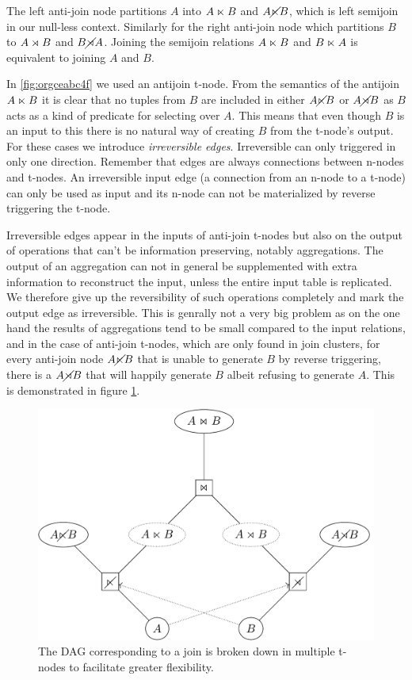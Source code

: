The left anti-join node partitions \(A\) into \(A \ltimes B\) and
\(A \cancel\ltimes B\), which is left semijoin in our null-less
context. Similarly for the right anti-join node which partitions \(B\) to \(A \rtimes B\) and \(B \cancel\rtimes A\). Joining the semijoin
relations \(A \ltimes B\) and \(B \ltimes A\) is equivalent to
joining \(A\) and \(B\).

In \ref{fig:orgceabc4f} we used an antijoin t-node. From the semantics of the
antijoin \(A \ltimes B\) it is clear that no tuples from \(B\) are
included in either \(A \cancel\ltimes B\) or \(A \cancel\rtimes B\) as \(B\) acts
as a kind of predicate for selecting over \(A\). This means that even
though \(B\) is an input to this there is no natural way of creating \(B\)
from the t-node's output. For these cases we introduce \emph{irreversible
  edges}. Irreversible can only triggered in only one
direction. Remember that edges are always connections between n-nodes
and t-nodes. An irreversible input edge (a connection from an n-node
to a t-node) can only be used as input and its n-node can not be
materialized by reverse triggering the t-node.

Irreversible edges appear in the inputs of anti-join t-nodes but also
on the output of operations that can't be information preserving,
notably aggregations. The output of an aggregation can not in general
be supplemented with extra information to reconstruct the input,
unless the entire input table is replicated. We therefore give up the
reversibility of such operations completely and mark the output edge
as irreversible. This is genrally not a very big problem as on the one
hand the results of aggregations tend to be small compared to the
input relations, and in the case of anti-join t-nodes, which are only
found in join clusters, for every anti-join node \(A \cancel\ltimes B\) that
is unable to generate \(B\) by reverse triggering, there is a \(A
\cancel\rtimes B\) that will happily generate \(B\) albeit refusing to
generate \(A\). This is demonstrated in figure \ref{fig:orgc670489}.

\begin{figure}[H]
  \centering
  \includegraphics[width=.9\linewidth]{./imgs/joinnetdir.pdf}
  \caption{\label{fig:orgc670489}The DAG corresponding to a join is broken down in multiple t-nodes to facilitate greater flexibility.}
\end{figure}
